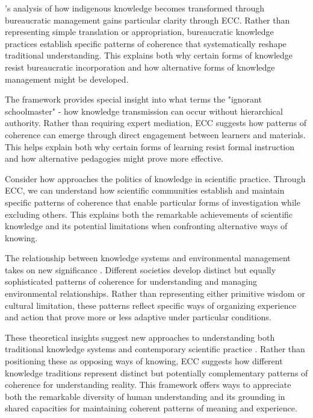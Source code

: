 \cite{nadasdy2003hunters}'s analysis of how indigenous knowledge becomes transformed through bureaucratic management gains particular clarity through ECC. Rather than representing simple translation or appropriation, bureaucratic knowledge practices establish specific patterns of coherence that systematically reshape traditional understanding. This explains both why certain forms of knowledge resist bureaucratic incorporation and how alternative forms of knowledge management might be developed.

The framework provides special insight into what \cite{ranciere1991ignorant} terms the "ignorant schoolmaster" - how knowledge transmission can occur without hierarchical authority. Rather than requiring expert mediation, ECC suggests how patterns of coherence can emerge through direct engagement between learners and materials. This helps explain both why certain forms of learning resist formal instruction and how alternative pedagogies might prove more effective.

Consider how \cite{stengers2010cosmopolitics} approaches the politics of knowledge in scientific practice. Through ECC, we can understand how scientific communities establish and maintain specific patterns of coherence that enable particular forms of investigation while excluding others. This explains both the remarkable achievements of scientific knowledge and its potential limitations when confronting alternative ways of knowing.

The relationship between knowledge systems and environmental management takes on new significance \cite{tsing2005friction}. Different societies develop distinct but equally sophisticated patterns of coherence for understanding and managing environmental relationships. Rather than representing either primitive wisdom or cultural limitation, these patterns reflect specific ways of organizing experience and action that prove more or less adaptive under particular conditions.

These theoretical insights suggest new approaches to understanding both traditional knowledge systems and contemporary scientific practice \cite{strathern1991partial}. Rather than positioning these as opposing ways of knowing, ECC suggests how different knowledge traditions represent distinct but potentially complementary patterns of coherence for understanding reality. This framework offers ways to appreciate both the remarkable diversity of human understanding and its grounding in shared capacities for maintaining coherent patterns of meaning and experience.